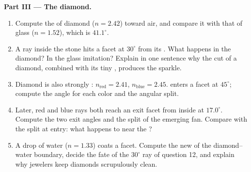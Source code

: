 \begin{problem}
\medskip
\noindent\textbf{Part III --- The diamond.}
\begin{enumerate}[resume]
  \item Compute the  of diamond ($n = 2.42$) toward air,
        and compare it with that of glass ($n = 1.52$),
        which is $41.1^\circ$.
  \item A ray inside the stone hits a facet at $30^\circ$ from its
        . What happens in the diamond? In the glass imitation?
        Explain in one sentence why the cut of a diamond, combined with
        its tiny , produces the sparkle.
  \item Diamond is also strongly : $n_{\text{red}} = 2.41$,
        $n_{\text{blue}} = 2.45$.  enters a facet at
        $45^\circ$; compute the  angle for each color and the
        angular split.
  \item Later, red and blue rays both reach an exit facet from inside
        at $17.0^\circ$. Compute the two exit angles and the split of
        the emerging fan. Compare with the split at entry: what happens
        to  near the ?
  \item A drop of water ($n = 1.33$) coats a facet. Compute the new
         of the diamond--water boundary, decide the fate
        of the $30^\circ$ ray of question 12, and explain why jewelers
        keep diamonds scrupulously clean.
\end{enumerate}


\end{problem}
